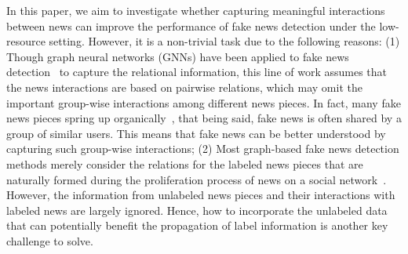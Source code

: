 \documentclass[conference]{IEEEtran}
\begin{document}
In this paper, we aim to investigate whether capturing meaningful interactions between news can improve the performance of fake news detection under the low-resource setting. However, it is a non-trivial task due to the following reasons: (1) Though graph neural networks (GNNs) have been applied to fake news detection~\cite{nguyen2020fang, ren2021fake} to capture the relational information, this line of work assumes that the news interactions are based on pairwise relations, which may omit the important group-wise interactions among different news pieces. In fact, many fake news pieces spring up organically~\cite{bernardi2012narrative}, that being said, fake news is often shared by a group of similar users. This means that fake news can be better understood by capturing such group-wise interactions; (2) Most graph-based fake news detection methods merely consider the relations for the labeled news pieces that are naturally formed during the proliferation process of news on a social network~\cite{dou2021user, han2020graph, bian2020rumor}. However, the information from unlabeled news pieces and their interactions with labeled news are largely ignored. Hence, how to incorporate the unlabeled data that can potentially benefit the propagation of label information is another key challenge to solve.
\end{document}
